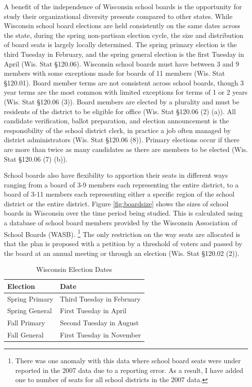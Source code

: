 A benefit of the independence of Wisconsin school boards is the opportunity for study 
their organizational diversity presents compared to other states. While Wisconsin school 
board elections are held consistently on the same dates across 
the state, during the spring non-partisan election cycle, the size and distribution 
of board seats is largely locally determined. The spring primary election is the 
third Tuesday in February, and the spring general election is the first Tuesday 
in April (Wis. Stat \S 120.06). Wisconsin school boards must have between 3 and 9 
members with some exceptions made for boards of 11 members (Wis. Stat \S 120.01). 
Board member terms are not consistent across school boards, though 3 year terms are 
the most common with limited exceptions for terms of 1 or 2 years (Wis. Stat \S 120.06 (3)). 
Board members are elected by a plurality and must be residents of the district to 
be eligible for office (Wis. Stat \S 120.06 (2) (a)). All candidate verification, 
ballot preparation, and election announcement is the responsibility of the school district 
clerk, in practice a job often managed by district administrators 
(Wis. Stat \S 120.06 (8)). Primary elections occur if there are more than 
twice as many candidates as there are members to be elected (Wis. Stat \S 120.06 (7) (b)). 

School boards also have flexibility to apportion their seats in different ways 
ranging from a board of 3-9 members each representing the entire district, to a board 
of 3-11 members each representing either a specific region of the school district or 
the entire district. Figure \ref{fig:boardsize} shows the sizes of school boards 
in Wisconsin over the time period being studied. This is calculated using a database 
of school board members provided by the Wisconsin Association of School Boards (WASB).
\footnote{There was one anomaly with this data where school board seats were under reported 
in the 2007 data due to a reporting error. As a result, I have added one to number of 
seats for all school districts in the 2007 data.} The only restriction on the way 
seats are allocated is that the plan is proposed with a petition by a threshold 
of voters and passed by the board at an annual meeting or through an election 
(Wis. Stat \S 120.02 (2)).


\begin{table}[h!]
\begin{center}
\caption{Wisconsin Election Dates}
\label{tab:elecdates}
\begin{tabular}{| p{} | p{} |}
\hline
\textbf{Election}  & \textbf{Date}  \\ \hline
Spring Primary  & Third Tuesday in February  \\ \hline
Spring General &  First Tuesday in April  \\ \hline
Fall Primary & Second Tuesday in August \\ \hline
Fall General & First Tuesday in November\\ \hline
\end{tabular}
\end{center}
\end{table}

